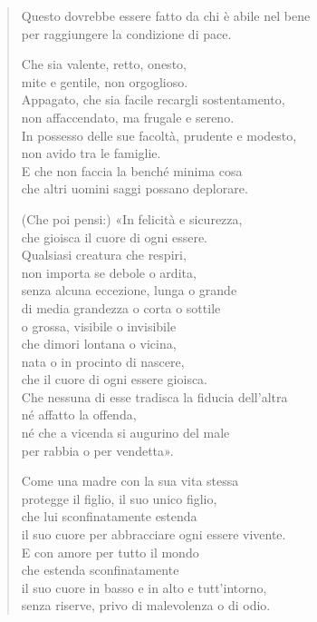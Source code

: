 \begin{quote}

\label{pag200b}\label{pag200}%
Questo dovrebbe essere fatto da chi è abile nel bene \\
per raggiungere la condizione di pace.

Che sia valente, retto, onesto, \\
mite e gentile, non orgoglioso. \\
Appagato, che sia facile recargli sostentamento, \\
non affaccendato, ma frugale e sereno. \\
In possesso delle sue facoltà, prudente e modesto, \\
non avido tra le famiglie. \\
E che non faccia la benché minima cosa \\
che altri uomini saggi possano deplorare.

(Che poi pensi:) «In felicità e sicurezza, \\
che gioisca il cuore di ogni essere. \\
Qualsiasi creatura che respiri, \\
non importa se debole o ardita, \\
senza alcuna eccezione, lunga o grande \\
di media grandezza o corta o sottile \\
o grossa, visibile o invisibile \\
che dimori lontana o vicina, \\
nata o in procinto di nascere, \\
che il cuore di ogni essere gioisca. \\
Che nessuna di esse tradisca la fiducia dell’altra \\
né affatto la offenda, \\
né che a vicenda si augurino del male \\
per rabbia o per vendetta».

Come una madre con la sua vita stessa \\
protegge il figlio, il suo unico figlio, \\
che lui sconfinatamente estenda \\
il suo cuore per abbracciare ogni essere vivente. \\
E con amore per tutto il mondo \\
che estenda sconfinatamente \\
il suo cuore in basso e in alto e tutt’intorno, \\
senza riserve, privo di malevolenza o di odio.


\end{quote}
